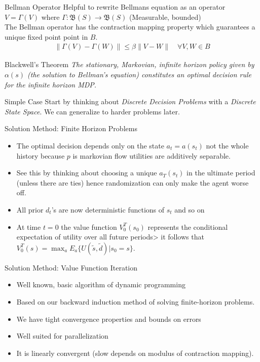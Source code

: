 \documentclass[aspectratio=169,11pt]{beamer}
\begin{document}
\begin{frame}{Bellman Operator}
Helpful to rewrite Bellmans equation as an operator $V = \Gamma(V)$ where $\Gamma: \mathfrak{B}(S) \rightarrow \mathfrak{B}(S)$ (Measurable, bounded) \\
\vspace{0.5cm}
The Bellman operator has the contraction mapping property which guarantees a unique fixed point point in $B$.
\begin{eqnarray*}
\| \Gamma(V) - \Gamma(W) \| \leq \beta \| V-W \| \quad \forall V,W \in B
\end{eqnarray*}
\begin{block}{Blackwell's Theorem}
\textit{The stationary, Markovian, infinite horizon policy given by $\alpha(s)$ (the solution to Bellman's equation)  constitutes an optimal decision rule for the infinite horizon MDP.}
\end{block}
\end{frame}

\begin{frame}{Simple Case}
Start by thinking about \textit{Discrete Decision Problems} with a \textit{Discrete State Space}.  We can generalize to harder problems later.
\end{frame}

\begin{frame}{Solution Method: Finite Horizon Problems}
\begin{itemize}
\item The optimal decision depends only on the state $a_t = a(s_t)$ not the whole history because $p$ is markovian flow utilities are additively separable.
\item See this by thinking about choosing a unique $a_T(s_t)$ in the ultimate period (unless there are ties) hence randomization can only make the agent worse off.
\item All prior $d_t$'s are now deterministic functions of $s_t$ and so on
\item At time $t=0$ the value function $V_0^T(s_0)$ represents the conditional expectation of utility over all future periods> it follows that $V_0^T(s) = \max_{a} E_{a}\{ U(\tilde{s},\tilde{d}) | s_0 = s\}$.
\end{itemize}
\end{frame}

\begin{frame}{Solution Method: Value Function Iteration}
\begin{itemize}
\item Well known, basic algorithm of dynamic programming
\item Based on our backward induction method of solving finite-horizon problems.
\item We have tight convergence properties and bounds on errors
\item Well suited for parallelization
\item It is linearly convergent (slow depends on modulus of contraction mapping).
\end{itemize}
\end{frame}
\end{document}
